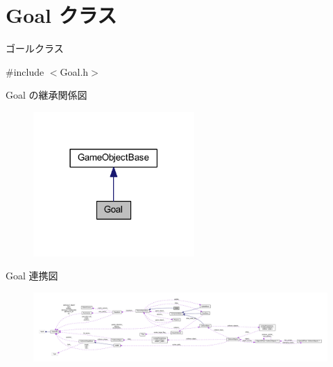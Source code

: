 \hypertarget{class_goal}{}\section{Goal クラス}
\label{class_goal}


ゴールクラス  




{\ttfamily \#include $<$Goal.\+h$>$}



Goal の継承関係図\nopagebreak
\begin{figure}[H]
\begin{center}
\leavevmode
\includegraphics[width=174pt]{class_goal__inherit__graph}
\end{center}
\end{figure}


Goal 連携図\nopagebreak
\begin{figure}[H]
\begin{center}
\leavevmode
\includegraphics[width=350pt]{class_goal__coll__graph}
\end{center}
\end{figure}
